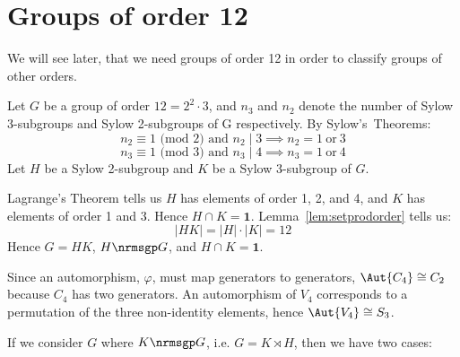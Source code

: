 \section{Groups of order 12}
We will see later, that we need groups of order 12 in order to classify groups of other orders.

Let \(G\) be a group of order \(12 = 2^2 \cdot 3\), and \(n_3\) and \(n_2\) denote the number of Sylow 3-subgroups and
Sylow 2-subgroups of G respectively.
By Sylow's~Theorems:
\[n_2 \equiv 1 \text{ (mod 2) and } n_2 \mid 3 \implies n_2 = 1 \ \text{or} \ 3\]
\[n_3 \equiv 1 \text{ (mod 3) and } n_3 \mid 4 \implies n_3 = 1 \ \text{or} \ 4\]
Let \(H\) be a Sylow 2-subgroup and \(K\) be a Sylow 3-subgroup of \(G\).

Lagrange's Theorem tells us \(H\) has elements of order 1, 2, and 4, and \(K\) has elements of order 1 and 3.
Hence \(H \cap K = \bm{1}\).
Lemma~\ref{lem:setprodorder} tells us:
\[|HK| = |H| \cdot |K| = 12\]
Hence \(G = HK\), \(H \nrmsgp G\), and \(H \cap K = \bm{1}\).

Since an automorphism, \(\varphi\), must map generators to generators, \(\Aut{C_4} \cong C_2\) because \(C_4\) has two
generators.
An automorphism of \(V_4\) corresponds to a permutation of the three
non-identity elements, hence \(\Aut{V_4} \cong S_3\).

If we consider \(G\) where \(K \nrmsgp G\), i.e. \(G = K \rtimes H\), then we have two cases:

